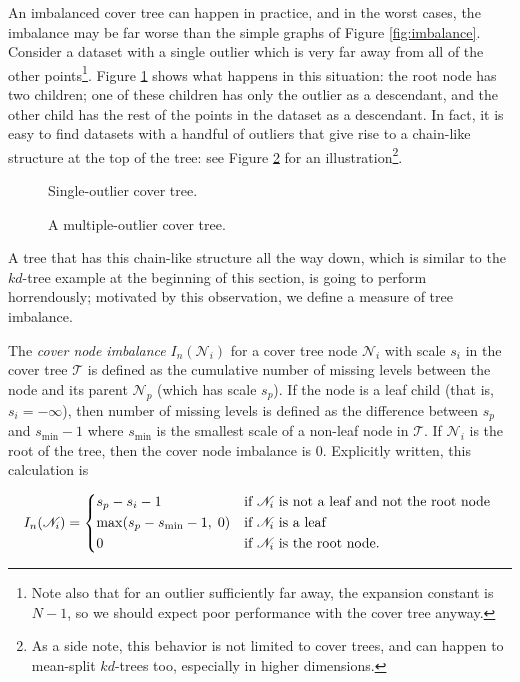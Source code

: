 An imbalanced cover tree can happen in practice, and in the worst cases, the
imbalance may be far worse than the simple graphs of Figure \ref{fig:imbalance}.
Consider a dataset with a single outlier which is very far away from all of the
other points\footnote{Note also that for an outlier sufficiently far away, the
expansion constant is $N - 1$, so we should expect poor performance with the
cover tree anyway.}.  Figure \ref{fig:outlier} shows what happens in
this situation: the root node has two children; one of these children has only
the outlier as a descendant, and the other child has the rest of the points in
the dataset as a descendant.  In fact, it is easy to find datasets with a
handful of outliers that give rise to a chain-like structure at the top of the
tree: see Figure \ref{fig:outliers} for an illustration\footnote{As a side note,
this behavior is not limited to cover trees, and can happen to mean-split
$kd$-trees too, especially in higher dimensions.}.

\begin{figure}
\begin{center}
  
\end{center}
\caption{Single-outlier cover tree.}
\label{fig:outlier}
\end{figure}

\begin{figure}
\begin{center}
  
\end{center}
\caption{A multiple-outlier cover tree.}
\label{fig:outliers}
\end{figure}

A tree that has this chain-like structure all the way down, which is similar to
the $kd$-tree example at the beginning of this section, is going to perform
horrendously; motivated by this observation, we define a measure of tree
imbalance.

\begin{defn}
The {\it cover node imbalance} $I_n(\mathscr{N}_i)$ for a cover tree node
$\mathscr{N}_i$ with scale $s_i$ in the cover tree $\mathscr{T}$ is defined as
the cumulative number of missing levels between the node and its parent
$\mathscr{N}_p$ (which has scale $s_p$).  If
the node is a leaf child (that is, $s_i = -\infty$), then number of missing
levels is defined as the difference between $s_p$ and $s_{\min} - 1$ where
$s_{\min}$ is the smallest scale of a non-leaf node in $\mathscr{T}$.  If
$\mathscr{N}_i$ is the root of the tree, then the cover node imbalance is 0.
Explicitly written, this calculation is

\begin{equation}
I_n(\mathscr{N}_i) = \begin{dcases*}
  s_p - s_i - 1 & if $\mathscr{N}_i$ is not a leaf and not the root node \\
  \max(s_p - s_{\min} - 1, \; 0) & if $\mathscr{N}_i$ is a leaf \\
  0 & if $\mathscr{N}_i$ is the root node.
  \end{dcases*}
  \label{eqn_node_imbalance}
\end{equation}
\end{defn}

